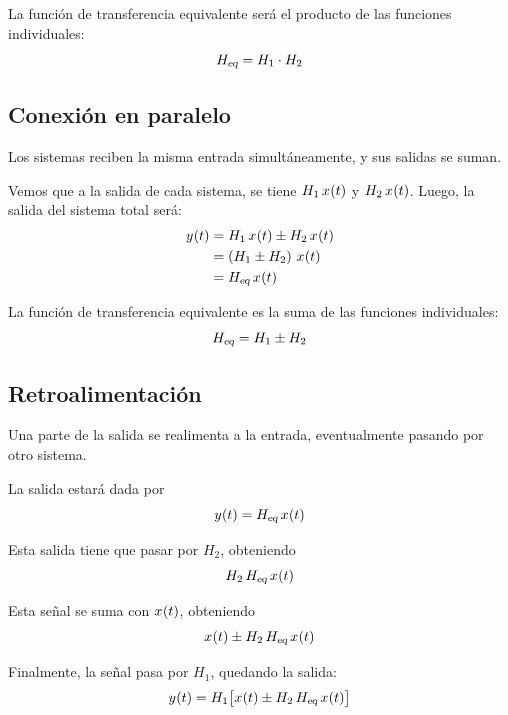 La función de transferencia equivalente será el producto de las funciones individuales:
\[
    \sub{H}{eq} = H_1 \cdot H_2
\]

\subsection{Conexión en paralelo}

Los sistemas reciben la misma entrada simultáneamente, y sus salidas se suman.

\begin{center}
    \def\svgwidth{0.8\linewidth}
    
\end{center}

Vemos que a la salida de cada sistema, se tiene $H_1 \, \fx[x]{t}$ y $H_2 \, \fx[x]{t}$.
Luego, la salida del sistema total será:
\begin{align*}
    \fx[y]{t}
    & = H_1 \, \fx[x]{t} \pm H_2 \, \fx[x]{t}
    \\
    & = \inParentheses{H_1 \pm H_2} \, \fx[x]{t}
    \\
    & = \sub{H}{eq} \, \fx[x]{t}
\end{align*}

La función de transferencia equivalente es la suma de las funciones individuales:
\[
    \sub{H}{eq} = H_1 \pm H_2
\]

\subsection{Retroalimentación}

Una parte de la salida se realimenta a la entrada, eventualmente pasando por otro sistema.

\begin{center}
    \def\svgwidth{0.8\linewidth}
    
\end{center}

La salida estará dada por
\[
    \fx[y]{t} = \sub{H}{eq} \, \fx[x]{t}
\]

Esta salida tiene que pasar por $H_2$, obteniendo
\[
    H_2 \, \sub{H}{eq} \, \fx[x]{t}
\]

Esta señal se suma con $\fx[x]{t}$, obteniendo
\[
    \fx[x]{t} \pm H_2 \, \sub{H}{eq} \, \fx[x]{t}
\]

Finalmente, la señal pasa por $H_1$, quedando la salida:
\[
    \fx[y]{t} = H_1 \inBrackets{\fx[x]{t} \pm H_2 \, \sub{H}{eq} \, \fx[x]{t}}
\]

